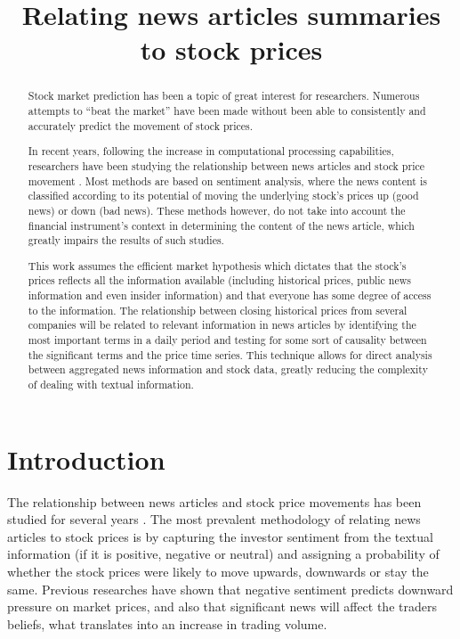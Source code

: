 \documentclass[conference,11pt]{IEEEtran}
\title{Relating news articles summaries\\ to stock prices}
\author{\IEEEauthorblockN{Marcelo Grossi}
    \IEEEauthorblockA{
    School of Computing\\
    Dublin City University\\
    Dublin, Ireland\\
    Email: marcelo.grossi2@mail.dcu.ie}
}
\begin{document}
\maketitle

\begin{abstract}
Stock market prediction has been a topic of great interest for researchers. Numerous attempts to ``beat the market'' have been made without been able to consistently and accurately predict the movement of stock prices.

\par
In recent years, following the increase in computational processing capabilities, researchers have been studying the relationship between news articles and stock price movement \citep{Fu2008,Schumaker2009}. Most methods are based on sentiment analysis, where the news content is classified according to its potential of moving the underlying stock's prices up (good news) or down (bad news). These methods however, do not take into account the financial instrument's context in determining the content of the news article, which greatly impairs the results of such studies.

\par
This work assumes the efficient market hypothesis which dictates that the stock's prices reflects all the information available (including historical prices, public news information and even insider information) \citep{fama1965behavior} and that everyone has some degree of access to the information. The relationship between closing historical prices from several companies will be related to relevant information in news articles by identifying the most important terms in a daily period and testing for some sort of causality between the significant terms and the price time series. This technique allows for direct analysis between aggregated news information and stock data, greatly reducing the complexity of dealing with textual information.
\end{abstract}

\section{Introduction}
The relationship between news articles and stock price movements has been studied for several years \citep{gidofalvi2001,Fu2008}. The most prevalent methodology of relating news articles to stock prices is by capturing the investor sentiment \citep{Handbook} from the textual information (if it is positive, negative or neutral) and assigning a probability of whether the stock prices were likely to move upwards, downwards or stay the same. Previous researches \citep{Tetlock2007} have shown that negative sentiment predicts downward pressure on market prices, and also \citep{barber2008all} that significant news will affect the traders beliefs, what translates into an increase in trading volume.
\end{document}
